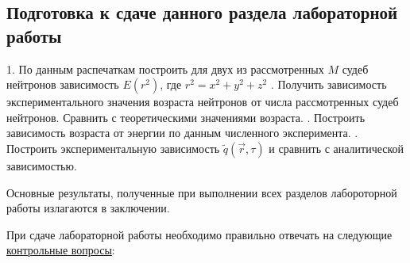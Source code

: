 \documentclass[a4paper]{article}
\begin{document}
    \subsection{Подготовка к сдаче данного раздела лабораторной работы}
    1. По данным распечаткам построить для двух из рассмотренных $M$
    судеб нейтронов зависимость $E(r^2)$, где \(r^2 = x^2 + y^2 + z^2\)
    . Получить зависимость экспериментального значения возраста
    нейтронов от числа рассмотренных судеб нейтронов. Сравнить с
    теоретическими значениями возраста.
    . Построить зависимость возраста от энергии по данным численного
    эксперимента.
    . Построить экспериментальную зависимость $\tilde{q}(\vec{r},\tau)$
    и сравнить с аналитической зависимостью. 

    Основные результаты, полученные при выполнении всех разделов
    лабороторной работы излагаются в заключении.

    При сдаче лабораторной работы необходимо правильно отвечать на
    следующие \underline{контрольные вопросы}:
\end{document}
